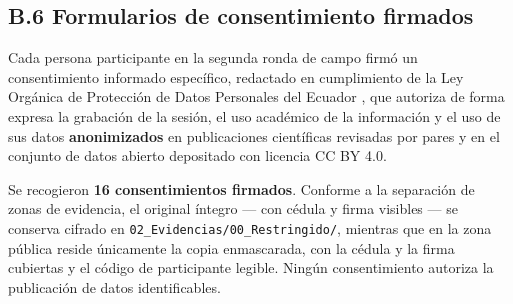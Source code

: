 \documentclass[journal,onecolumn]{IEEEtran}
\begin{document}
	\subsection*{B.6 Formularios de consentimiento firmados}
	
	Cada persona participante en la segunda ronda de campo firmó un consentimiento
	informado específico, redactado en cumplimiento de la Ley Orgánica de
	Protección de Datos Personales del Ecuador \cite{lopdp2021}, que autoriza de
	forma expresa la grabación de la sesión, el uso académico de la información y
	el uso de sus datos \textbf{anonimizados} en publicaciones científicas
	revisadas por pares y en el conjunto de datos abierto depositado con licencia
	CC BY 4.0.
	
	Se recogieron \textbf{16 consentimientos firmados}. Conforme a la separación
	de zonas de evidencia, el original íntegro --- con cédula y firma visibles ---
	se conserva cifrado en \texttt{02\_Evidencias/00\_Restringido/}, mientras que
	en la zona pública reside únicamente la copia enmascarada, con la cédula y la
	firma cubiertas y el código de participante legible. Ningún consentimiento
	autoriza la publicación de datos identificables.
	
\end{document}
